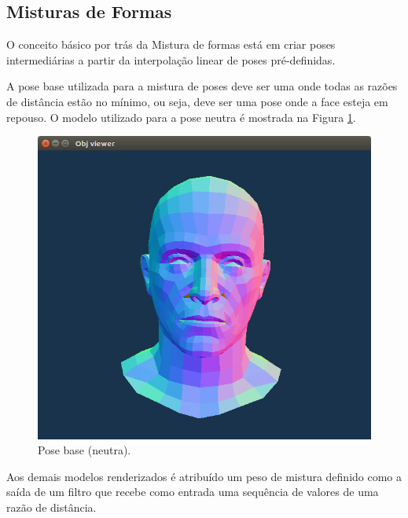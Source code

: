 \subsection{Misturas de Formas}

O conceito básico por trás da Mistura de formas está em criar poses intermediárias a partir da interpolação linear de poses pré-definidas.

A pose base utilizada para a mistura de poses deve ser uma onde todas as razões de distância estão no mínimo, ou seja, deve ser uma pose onde a face esteja em repouso. O modelo utilizado para a pose neutra é mostrada na Figura \ref{fig:blend-shapes-base-model}.

\begin{figure}[!htb]
   \centering
  \includegraphics[width=0.8\linewidth]{./figs/rosto-neutro.png}
\caption{Pose base (neutra).}
\label{fig:blend-shapes-base-model}
\end{figure}

Aos demais modelos renderizados é atribuído um peso de mistura definido como a saída de um filtro que recebe como entrada uma sequência de valores de uma razão de distância.

